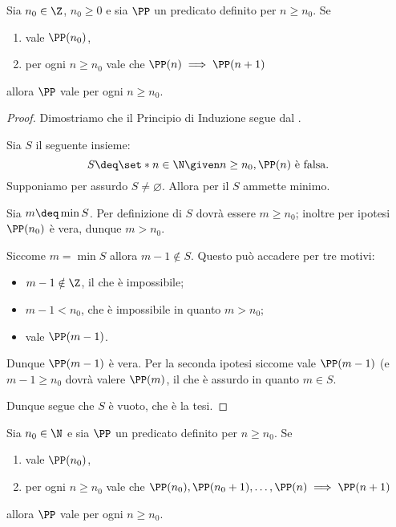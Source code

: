 \begin{theorem}
     \label{th:induzione} Sia $n_0 \in \Z$, $n_0 \geq 0$ e sia $\PP$ un predicato definito per $n \geq n_0$. Se \begin{enumerate}
        \item vale $\PP(n_0)$,
        \item per ogni $n \geq n_0$ vale che $\PP(n) \implies \PP(n+1)$
    \end{enumerate}
    allora $\PP$ vale per ogni $n \geq n_0$.
\end{theorem}
\begin{proof}
    Dimostriamo che il Principio di Induzione segue dal .

    Sia $S$ il seguente insieme: \[
        S \deq \set*{n \in \N \given n\geq n_0, \PP(n) \text{ è falsa}}.    
    \] Supponiamo per assurdo $S \neq \varnothing$. Allora per il  $S$ ammette minimo. 
    
    Sia $m \deq \min S$. Per definizione di $S$ dovrà essere $m \geq n_0$; inoltre per ipotesi $\PP(n_0)$ è vera, dunque $m > n_0$.

    Siccome $m = \min S$ allora $m - 1 \notin S$. Questo può accadere per tre motivi: \begin{itemize}
        \item $m - 1 \notin \Z$, il che è impossibile;
        \item $m - 1 < n_0$, che è impossibile in quanto $m > n_0$;
        \item vale $\PP(m-1)$.
    \end{itemize}

    Dunque $\PP(m-1)$ è vera. Per la seconda ipotesi siccome vale $\PP(m-1)$ (e $m - 1 \geq n_0$ dovrà valere $\PP(m)$, il che è assurdo in quanto $m \in S$.

    Dunque segue che $S$ è vuoto, che è la tesi.
\end{proof}

\begin{theorem}
     \label{th:induzione_forte} Sia $n_0 \in \N$ e sia $\PP$ un predicato definito per $n \geq n_0$. Se \begin{enumerate}
        \item vale $\PP(n_0)$,
        \item per ogni $n \geq n_0$ vale che $\PP(n_0), \PP(n_0 + 1), \dots, \PP(n) \implies \PP(n+1)$
    \end{enumerate}
    allora $\PP$ vale per ogni $n \geq n_0$.
\end{theorem}

